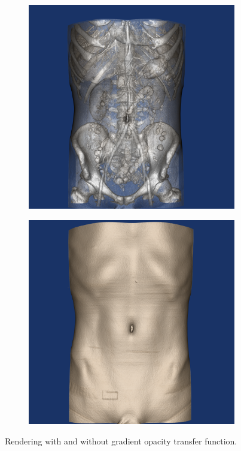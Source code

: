 \begin{figure}
\centering
   \begin{subfigure}[b]{0.5\textwidth}
   \includegraphics[width=1\linewidth]{TorsoGradient.png}
   \caption{}
   \label{fig:Ng1} 
\end{subfigure}

\begin{subfigure}[b]{0.5\textwidth}
   \includegraphics[width=1\linewidth]{TorsoNoGradient.png}
   \caption{}
   \label{fig:Ng2}
\end{subfigure}

\caption{Rendering with and without gradient opacity transfer function.}
\label{fig:gradient}
\end{figure}
